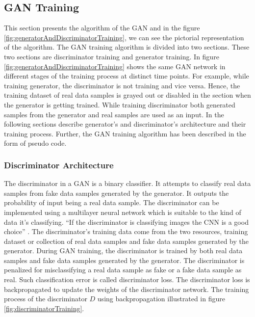 \subsection{\ac{GAN} Training}

This section presents the algorithm of the \ac{GAN} and in the figure \ref{fig:generatorAndDiscriminatorTraining}, we can see the pictorial representation of the algorithm. The GAN training algorithm is divided into two sections. These two sections are discriminator training and generator training. In figure \ref{fig:generatorAndDiscriminatorTraining} shows the same GAN network in different stages of the training process at distinct time points. For example, while training generator, the discriminator is not training and vice versa. Hence, the training dataset of real data samples is grayed out or disabled in the section when the generator is getting trained. While training discriminator both generated samples from the generator and real samples are used as an input. In the following sections describe generator's and discriminator's architecture and their training process. Further, the \ac{GAN} training algorithm has been described in the form of pseudo code.

\subsubsection{Discriminator Architecture}\label{TheDiscriminatorSubSection}

The discriminator in a \ac{GAN} is a binary classifier. It attempts to classify real data samples from fake data samples generated by the generator. It outputs the probability of input being a real data sample. The discriminator can be implemented using a multilayer neural network which is suitable to the kind of data it's classifying. ``If the discriminator is classifying images the \ac{CNN} is a good choice'' \cite{radford2016unsupervised}. The discriminator's training data come from the two resources, training dataset or collection of real data samples and fake data samples generated by the generator. During \ac{GAN} training, the discriminator is trained by both real data samples and fake data samples generated by the generator. The discriminator is penalized for misclassifying a real data sample as fake or a fake data sample as real. Such classification error is called discriminator loss. The discriminator loss is backpropagated to update the weights of the discriminator network. The training process of the discriminator $D$ using backpropagation illustrated in figure \ref{fig:discriminatorTraining}.


